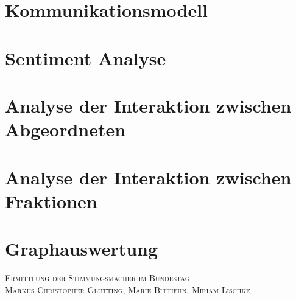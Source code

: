 \documentclass[a4paper,12pt,twoside]{book}
\begin{document}
\chapter{Kommunikationsmodell}






\chapter{Sentiment Analyse}






\chapter{Analyse der Interaktion zwischen Abgeordneten}


\chapter{Analyse der Interaktion zwischen Fraktionen}






\chapter{Graphauswertung}
\normalsize \textsc{Ermittlung der Stimmungsmacher im Bundestag} \\
\normalsize \textsc{Markus Christopher Glutting, Marie Bittiehn, Miriam Lischke}





\end{document}
